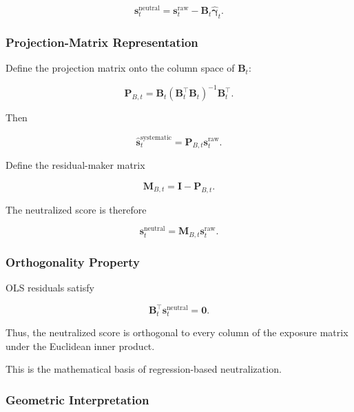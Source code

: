 \documentclass[11pt,a4paper]{article}
\begin{document}
\begin{equation}
\boxed{
\mathbf{s}_t^{\mathrm{neutral}}
=
\mathbf{s}_t^{\mathrm{raw}}
-
\mathbf{B}_t
\widehat{\boldsymbol{\gamma}}_t.
}
\end{equation}


\subsubsection{Projection-Matrix Representation}

Define the projection matrix onto the column space of $\mathbf{B}_t$:

\begin{equation}
\boxed{
\mathbf{P}_{B,t}
=
\mathbf{B}_t
\left(
\mathbf{B}_t^\top
\mathbf{B}_t
\right)^{-1}
\mathbf{B}_t^\top.
}
\end{equation}

Then

\begin{equation}
\widehat{\mathbf{s}}_t^{\mathrm{systematic}}
=
\mathbf{P}_{B,t}
\mathbf{s}_t^{\mathrm{raw}}.
\end{equation}

Define the residual-maker matrix

\begin{equation}
\boxed{
\mathbf{M}_{B,t}
=
\mathbf{I}
-
\mathbf{P}_{B,t}.
}
\end{equation}

The neutralized score is therefore

\begin{equation}
\boxed{
\mathbf{s}_t^{\mathrm{neutral}}
=
\mathbf{M}_{B,t}
\mathbf{s}_t^{\mathrm{raw}}.
}
\end{equation}


\subsubsection{Orthogonality Property}

OLS residuals satisfy

\begin{equation}
\boxed{
\mathbf{B}_t^\top
\mathbf{s}_t^{\mathrm{neutral}}
=
\mathbf{0}.
}
\end{equation}

Thus, the neutralized score is orthogonal to every column of the exposure
matrix under the Euclidean inner product.

This is the mathematical basis of regression-based neutralization.


\subsubsection{Geometric Interpretation}
\end{document}
